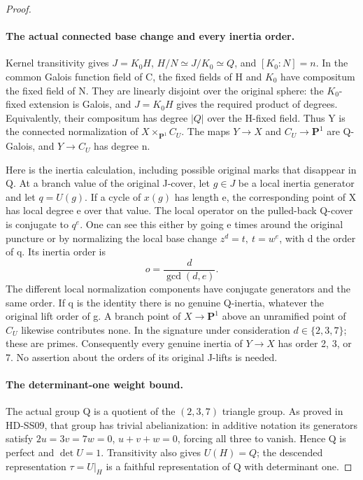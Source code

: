 \begin{proof}
\paragraph{The actual connected base change and every inertia order.}
Kernel transitivity gives \(J=K_0H\),
\(H/N\simeq J/K_0\simeq Q\), and \([K_0:N]=n\).
In the common Galois function field of C, the fixed fields of H
and \(K_0\) have compositum the fixed field of N.  They are
linearly disjoint over the original sphere: the \(K_0\)-fixed
extension is Galois, and \(J=K_0H\) gives the required product of
degrees.  Equivalently, their compositum has degree \(|Q|\) over
the H-fixed field.  Thus Y is the connected normalization of
\(X\times_{\mathbf P^1}C_U\).  The maps \(Y\to X\) and
\(C_U\to\mathbf P^1\) are Q-Galois, and \(Y\to C_U\) has degree n.

Here is the inertia calculation, including possible original marks
that disappear in Q.  At a branch value of the original J-cover,
let \(g\in J\) be a local inertia generator and let \(q=U(g)\).
If a cycle of \(x(g)\) has length e, the corresponding point of X
has local degree e over that value.  The local operator on the
pulled-back Q-cover is conjugate to \(q^e\).  One can see this
either by going e times around the original puncture or by
normalizing the local base change \(z^d=t,\ t=w^e\), with d the
order of q.  Its inertia order is
\[
                   o=\frac{d}{\gcd(d,e)}.
 \tag{SW.5}
\]
The different local normalization components have conjugate
generators and the same order.  If q is the identity there is no
genuine Q-inertia, whatever the original lift order of g.
A branch point of \(X\to\mathbf P^1\) above an unramified point
of \(C_U\) likewise contributes none.  In the signature under
consideration \(d\in\{2,3,7\}\); these are primes.  Consequently
every genuine inertia of \(Y\to X\) has order 2, 3, or 7.
No assertion about the orders of its original J-lifts is needed.

\paragraph{The determinant-one weight bound.}
The actual group Q is a quotient of the \((2,3,7)\) triangle group.
As proved in HD-SS09, that group has trivial abelianization:
in additive notation its generators satisfy
\(2u=3v=7w=0\), \(u+v+w=0\), forcing all three to vanish.
Hence Q is perfect and \(\det U=1\).  Transitivity also gives
\(U(H)=Q\); the descended representation \(\tau=U|_H\) is a
faithful representation of Q with determinant one.


\end{proof}
